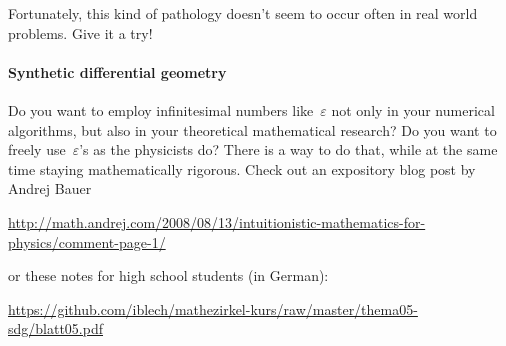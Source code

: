\documentclass[a4paper,ngerman,12pt]{scrartcl}
\theoremstyle{definition}
\theoremstyle{plain}
\theoremstyle{remark}
\begin{document}
Fortunately, this kind of pathology doesn't seem to occur often in real world
problems. Give it a try!

\paragraph{Synthetic differential geometry} Do you want to employ infinitesimal
numbers like~$\varepsilon$ not only in your numerical algorithms, but also in
your theoretical mathematical research? Do you want to freely
use~$\varepsilon$'s as the physicists do? There is a way to do that, while at
the same time staying mathematically rigorous. Check out an expository
blog post by Andrej Bauer

\begin{center}\small\url{http://math.andrej.com/2008/08/13/intuitionistic-mathematics-for-physics/comment-page-1/}\end{center}

or these notes for high school students (in German):

\begin{center}\small\url{https://github.com/iblech/mathezirkel-kurs/raw/master/thema05-sdg/blatt05.pdf}\end{center}
\end{document}
